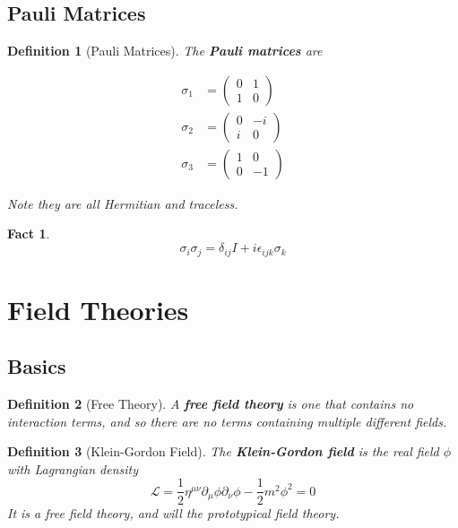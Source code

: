 \documentclass{article}
\newtheorem{definition}{Definition}[subsection]
\newtheorem{fact}{Fact}[subsection]
\newcommand{\del}{\partial}
\newcommand{\bam}[1]{\textbf{#1}}
\newcommand{\mc}[1]{\mathcal{#1}}
\newcommand{\be}{\begin{equation}} %
\newcommand{\ee}{\end{equation}}
\begin{document}
\subsection{Pauli Matrices}

\begin{definition}[Pauli Matrices]
The \bam{Pauli matrices} are

\begin{align*}
\sigma_1 &= \begin{pmatrix} 0 & 1 \\ 1 & 0\end{pmatrix}  \\
\sigma_2 &= \begin{pmatrix} 0 & -i \\ i & 0\end{pmatrix}  \\
\sigma_3 &= \begin{pmatrix} 1 & 0 \\ 0 & -1\end{pmatrix}  
\end{align*}

Note they are all Hermitian and traceless.
\end{definition}

\begin{fact}
\be
\sigma_i \sigma_j = \delta_{ij}I +i\epsilon_{ijk}\sigma_k
\ee
\end{fact}
\section{Field Theories}

\subsection{Basics}

\begin{definition}[Free Theory]
A \bam{free field theory} is one that contains no interaction terms, and so there are no terms containing multiple different fields. 
\end{definition}

\begin{definition}[Klein-Gordon Field]
The \bam{Klein-Gordon field} is the real field $\phi$ with Lagrangian density
\[
\mc{L}=\frac{1}{2}\eta^{\mu\nu} \del_\mu\phi \del_\nu\phi-\frac{1}{2}m^2\phi^2=0
\]
It is a free field theory, and will the prototypical field theory.
\end{definition}
\end{document}
